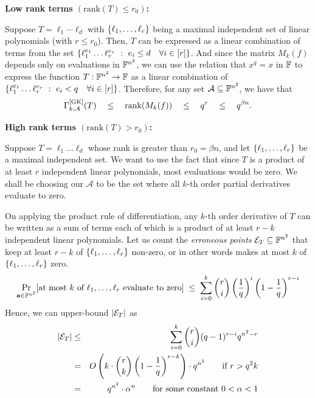 \noindent 
{\bf Low rank terms $(\mathrm{rank}(T) \leq r_0)$:}

Suppose $T = \ell_1 \cdots \ell_d$ with $\left\{\ell_1, \dots, \ell_r\right\}$ being a maximal independent set of linear polynomials (with $r \leq r_0$). Then, $T$ can be expressed as a linear combination of terms from the set $\left\{{\ell_1^{e_1}\dots \ell_r^{e_r}}\ : \ {e_i\leq d \quad \forall i\in [r]}\right\}$. And since the matrix $M_k(f)$ depends only on evaluations in $\mathbb{F}^{n^2}$, we can use the relation that $x^q = x$ in $\mathbb{F}$ to express the function $T:\mathbb{F}^{n^2}\rightarrow \mathbb{F}$ as a linear combination of $\left\{{\ell_1^{e_1}\dots \ell_r^{e_r}}\ : \ {e_i<q \quad \forall i\in [r]}\right\}$. Therefore, for any set $\mathcal{A}\subseteq \mathbb{F}^{n^2}$, we have that
$$
\Gamma^{\mathrm{[GK]}}_{k;\mathcal{A}}(T) \quad \leq \quad
\mathrm{rank}(M_k(f)) \quad \leq \quad q^r \quad\leq \quad q^{\beta{n}}.
$$


\noindent
{\bf High rank terms $(\mathrm{rank}(T) > r_0)$:}

Suppose $T = \ell_1\dots \ell_d$ whose rank is greater than $r_0 = \beta n$, and let $\left\{\ell_1, \dots, \ell_r\right\}$ be a maximal independent set. We want to use the fact that since $T$ is a product of at least $r$ independent linear polynomials, most evaluations would be zero. We shall be choosing our $\mathcal{A}$ to be the set where all $k$-th order partial derivatives evaluate to zero.

On applying the product rule of differentiation, any $k$-th order derivative of $T$ can be written as a sum of terms each of which is a product of at least $r-k$ independent linear polynomials. Let us count the \emph{erroneous points} $\mathcal{E}_T\subseteq \mathbb{F}^{n^2}$ that keep at least $r-k$ of $\left\{\ell_1,\dots, \ell_r\right\}$ non-zero, or in other words makes at most $k$ of $\left\{\ell_1,\dots, \ell_r\right\}$ zero.
$$
\Pr_{\mathbf{a}\in \mathbb{F}^{n^2}}[\text{at most $k$ of $\ell_1,\dots,
  \ell_r$ evaluate to zero}] \;\leq \; \sum_{i=0}^k \binom{r}{i} \left(\frac{1}{q}\right)^i\left(1 - \frac{1}{q}\right)^{r-i}
$$
Hence, we can upper-bound $\left|\mathcal{E}_T\right|$ as
\begin{eqnarray*}
\left|\mathcal{E}_T\right| &\leq & \sum_{i=0}^k \binom{r}{i} (q-1)^{r-i}q^{n^2 - r}\\
 & = & O\left(k\cdot \binom{r}{k}\left(1 - \frac{1}{q}\right)^{r-k}\right) \cdot  q^{n^2} \qquad\text{if $r > q^2 k$}\\
 & = & q^{n^2} \cdot \alpha^n \qquad\text{for some constant $0 < \alpha < 1$}\\
 \end{eqnarray*}

